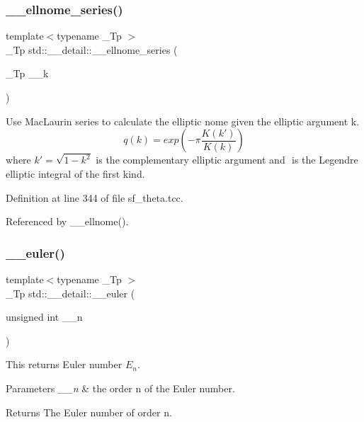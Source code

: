 \subsubsection{\texorpdfstring{\+\_\+\+\_\+ellnome\+\_\+series()}{\_\_ellnome\_series()}}
{\footnotesize\ttfamily template$<$typename \+\_\+\+Tp $>$ \\
\+\_\+\+Tp std\+::\+\_\+\+\_\+detail\+::\+\_\+\+\_\+ellnome\+\_\+series (\begin{DoxyParamCaption}\item[{\+\_\+\+Tp}]{\+\_\+\+\_\+k }\end{DoxyParamCaption})}

Use Mac\+Laurin series to calculate the elliptic nome given the elliptic argument k. \[ q(k) = exp\left(-\pi\frac{K(k')}{K(k)}\right) \] where $ k' = \sqrt{1 - k^2} $ is the complementary elliptic argument and $ $ is the Legendre elliptic integral of the first kind. 

Definition at line 344 of file sf\+\_\+theta.\+tcc.



Referenced by \+\_\+\+\_\+ellnome().

\mbox{\label{namespacestd_1_1____detail_a38f2ed4541c9876b8549c3917aad3b08}} 
\subsubsection{\texorpdfstring{\+\_\+\+\_\+euler()}{\_\_euler()}\hspace{0.1cm}{\footnotesize\ttfamily [1/2]}}
{\footnotesize\ttfamily template$<$typename \+\_\+\+Tp $>$ \\
\+\_\+\+Tp std\+::\+\_\+\+\_\+detail\+::\+\_\+\+\_\+euler (\begin{DoxyParamCaption}\item[{unsigned int}]{\+\_\+\+\_\+n }\end{DoxyParamCaption})\hspace{0.3cm}{\ttfamily [inline]}}



This returns Euler number $ E_n $. 


\begin{DoxyParams}{Parameters}
{\em \+\_\+\+\_\+n} & the order n of the Euler number. \\
\hline
\end{DoxyParams}
\begin{DoxyReturn}{Returns}
The Euler number of order n. 
\end{DoxyReturn}


